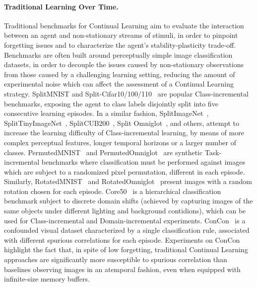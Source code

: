 \paragraph{Traditional Learning Over Time.}
Traditional benchmarks for Continual Learning aim to evaluate the interaction between an agent and non-stationary streams of stimuli, in order to pinpoint forgetting issues and to characterize the agent's stability-plasticity trade-off. Benchmarks are often built around perceptually simple image classification datasets, in order to decouple the issues caused by non-stationary observations from those caused by a challenging learning setting, reducing the amount of experimental noise which can affect the assessment of a Continual Learning strategy.
SplitMNIST and Split-Cifar10/100/110~\cite{zenke2017continual,maltoni2019continuous} are popular Class-incremental benchmarks, exposing the agent to class labels disjointly split into five consecutive learning episodes. In a similar fashion, SplitImageNet~\cite{rebuffi2017icarl}, SplitTinyImageNet~\cite{de2021continual}, SplitCUB200~\cite{lomonaco2021avalanche}, Split Omniglot~\cite{schwarz2018progress}, and others, attempt to increase the learning difficulty of Class-incremental learning, by means of more complex perceptual features, longer temporal horizons or a larger number of classes.
PermutedMNIST~\cite{zenke2017continual} and PermutedOmniglot~\cite{schwarz2018progress} are synthetic Task-incremental benchmarks where classification must be performed against images which are subject to a randomized pixel permutation,  different in each episode. Similarly, RotatedMNIST~\cite{lomonaco2021avalanche} and RotatedOmniglot~\cite{lomonaco2021avalanche} present images with a random rotation chosen for each episode.
%
Core50~\cite{lomonaco2017core50} is a hierarchical classification benchmark subject to discrete domain shifts (achieved by capturing images of the same objects under different lighting and background contidions), which can be used for Class-incremental and Domain-incremental experiments.
ConCon~\cite{busch2024truth} is a confounded visual dataset characterized by a single classification rule, associated with different spurious correlations for each episode. Experiments on ConCon highlight the fact that, in spite of low forgetting, traditional Continual Learning approaches are significantly more susceptible to spurious correlation than baselines observing images in an atemporal fashion, even when equipped with infinite-size memory buffers.

